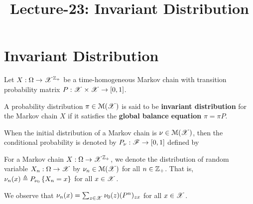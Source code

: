 \documentclass[letterpaper,10pt,english]{article}
\title{ Lecture-23: Invariant Distribution}
\author{}
\begin{document}
\maketitle

\section{Invariant Distribution} 
Let $X: \Omega \to \mathscr{X}^{\mathbb{Z}_+}$ be a time-homogeneous Markov chain with transition probability matrix $P: \mathscr{X}\times\mathscr{X}\to[0,1]$. 
\begin{defn} 
A probability distribution $\pi \in \mathcal{M}(\mathscr{X})$ is said to be %
\textbf{invariant distribution} for the Markov chain $X$ if it satisfies the \textbf{global balance equation} $\pi = \pi P$. 
\end{defn}
\begin{defn} 
When the initial distribution of a Markov chain is $\nu \in \mathcal{M}(\mathscr{X})$, 
then the conditional probability is denoted by $P_\nu: \mathscr{F} \to [0,1]$ defined by 
\end{defn}
\begin{defn} 
For a Markov chain $X:\Omega\to\mathscr{X}^{\mathbb{Z}_+}$, 
we denote the distribution of random variable $X_n:\Omega\to\mathscr{X}$ by $\nu_n \in \mathcal{M}(\mathscr{X})$ for all $n \in \mathbb{Z}_+$. 
That is, $\nu_n(x) \triangleq P_{\nu_0}\left\{X_n = x\right\}$ for all $x \in \mathscr{X}$. 
\end{defn}
\begin{rem} 
We observe that $\nu_n(x) = \sum_{z\in\mathscr{X}}\nu_0(z)(P^n)_{zx}$ for all $x \in \mathscr{X}$. 
\end{rem}
\end{document}
